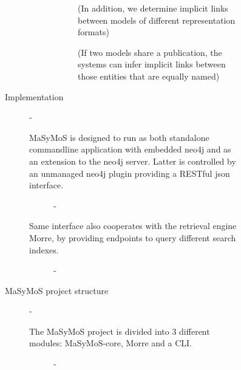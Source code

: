 \begin{description}
\begin{description}
\begin{description}
\begin{description}
\begin{description}
          \begin{description}
            \item[ \cite{Henkel2015} ] (In addition, we determine implicit links between models of different representation formats)
            \item[ \cite{Henkel2015} ] (If two models share a publication, the systems can infer implicit links between those entities that are equally named)
          \end{description} %
        \end{description} %
        \item[Implementation] - 
        \begin{description}
          \item[MaSyMoS is designed to run as both standalone commandline application with embedded neo4j and as an extension to the neo4j server. Latter is controlled by an unmanaged neo4j plugin providing a RESTful json interface.] - 
          \item[Same interface also cooperates with the retrieval engine Morre, by providing endpoints to query different search indexes.] - 
        \end{description} %
        \item[MaSyMoS project structure] - 
        \begin{description}
          \item[The MaSyMoS project is divided into 3 different modules: MaSyMoS-core, Morre and a CLI.] - 

\end{description}
\end{description}
\end{description}
\end{description}
\end{description}
